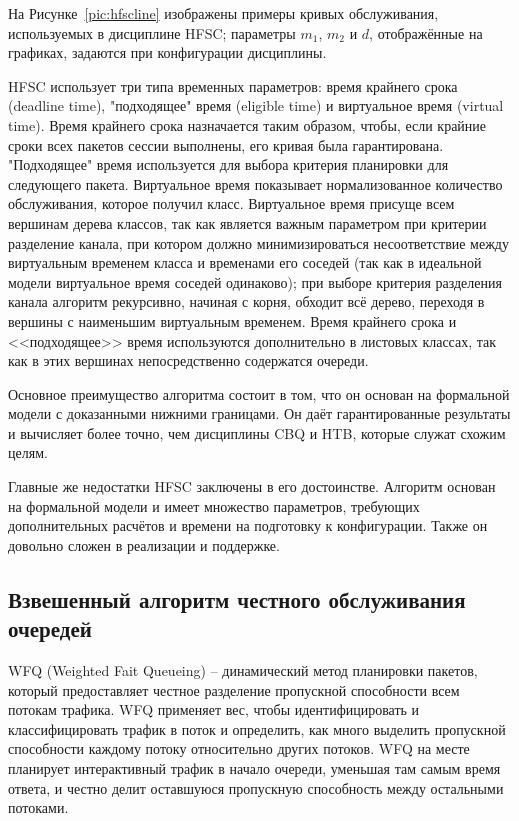 		На Рисунке~\ref{pic:hfscline} изображены примеры кривых обслуживания, используемых
		в дисциплине HFSC; параметры $m_1$, $m_2$ и $d$, отображённые на графиках, задаются
		при конфигурации дисциплины.\cite{hfscguide}

        HFSC использует три типа временных параметров: время крайнего срока (deadline
        time), "подходящее" время (eligible time) и виртуальное время (virtual time). Время крайнего
        срока назначается таким образом, чтобы, если крайние сроки всех пакетов сессии
        выполнены, его кривая была гарантирована. "Подходящее" время используется для
        выбора критерия планировки для следующего пакета. Виртуальное время показывает
        нормализованное количество обслуживания, которое получил класс. Виртуальное
        время присуще всем вершинам дерева классов, так как является важным параметром
        при критерии разделение канала, при котором должно минимизироваться
        несоответствие между виртуальным временем класса и временами его соседей
        (так как в идеальной модели виртуальное время соседей одинаково); при выборе
        критерия разделения канала алгоритм рекурсивно, начиная с корня, обходит всё
        дерево, переходя в вершины с наименьшим виртуальным временем. Время крайнего
        срока и <<подходящее>> время используются дополнительно в листовых классах,
        так как в этих вершинах непосредственно содержатся очереди.\cite{hfsc}

		Основное преимущество алгоритма состоит в том, что он основан
		на формальной модели с доказанными нижними границами. Он даёт гарантированные
		результаты и вычисляет более точно, чем дисциплины CBQ и HTB, которые
		служат схожим целям.

		Главные же недостатки HFSC заключены в его достоинстве. Алгоритм основан
		на формальной модели и имеет множество параметров, требующих дополнительных
		расчётов и времени на подготовку к конфигурации. Также он довольно сложен
		в реализации и поддержке. 

    \subsection{Взвешенный алгоритм честного обслуживания очередей}

    WFQ (Weighted Fait Queueing) -- динамический метод планировки пакетов, который
    предоставляет честное разделение пропускной способности всем потокам трафика.
    WFQ применяет вес, чтобы идентифицировать и классифицировать трафик
    в поток и определить, как много выделить пропускной способности каждому
    потоку относительно других потоков. WFQ на месте планирует интерактивный трафик в начало очереди,
    уменьшая там самым время ответа, и честно делит оставшуюся пропускную
    способность между остальными потоками. \cite{ciscoguide}


